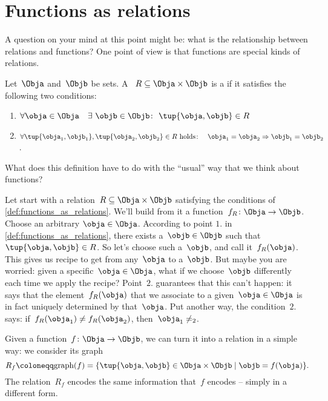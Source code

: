 

\section{Functions as relations}

A question on your mind at this point might be: what is the relationship between relations and functions? One point of view is that functions are special kinds of relations.

\begin{definition}
  \label{def:functions_as_relations}
  Let~$\Obja$ and~$\Objb$ be sets. A ~$R \subseteq \Obja \times \Objb$ is a \textbf{} if it satisfies the following two conditions:
  \begin{enumerate}
    \item $\forall \obja \in \Obja \quad \exists \ \objb \in \Objb\colon  \ \tup{\obja,\objb} \in R$
    \item $\forall \tup{\obja_1, \objb_1}, \tup{\obja_2, \objb_2} \in R  \text{ holds}\colon \quad \obja_1 = \obja_2 \Rightarrow \objb_1 = \objb_2$.
  \end{enumerate}
\end{definition}

What does this definition have to do with the ``usual'' way that we think about functions?

Let start with a relation~$R \subseteq \Obja \times \Objb$ satisfying the conditions of \cref{def:functions_as_relations}. We'll build from it a function~$f_R \colon \Obja \to \Objb$. Choose an arbitrary $\obja \in \Obja$. According to point $1.$ in \cref{def:functions_as_relations}, there exists a~$\objb \in \Objb$ such that~$\tup{\obja,\objb} \in R$. So let's choose such a~$\objb$, and call it~$f_R(\obja)$. This gives us recipe to get from any~$\obja$ to a~$\objb$. But maybe you are worried: given a specific~$\obja \in \Obja$, what if we choose~$\objb$ differently each time we apply the recipe? Point~$2.$ guarantees that this can't happen: it says that the element~$f_R(\obja)$ that we associate to a given~$\obja \in \Obja$ is in fact uniquely determined by that~$\obja$. Put another way, the condition~$2.$ says: if~$f_R(\obja_1) \neq f_R(\obja_2)$, then~$\obja_1 \neq _2$.

Given a function~$f \colon \Obja \rightarrow \Objb$, we can turn it into a relation in a simple way: we consider its graph
\begin{equation*}
  R_f \coloneqq \text{graph}(f) = \{ \tup{\obja,\objb} \in \Obja \times \Objb \mid \objb= f(\obja) \}.
\end{equation*}
The relation~$R_f$ encodes the same information that~$f$ encodes -- simply in a different form.


